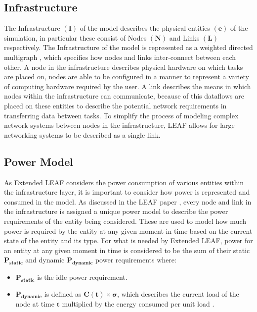 \documentclass{l4proj}
\begin{document}
\subsection{Infrastructure}\label{subsec:infrastructure}
The Infrastructure $\mathbf{(I)}$ of the model describes the physical entities $\mathbf{(e)}$ of the simulation, in particular these consist of Nodes $\mathbf{(N)}$ and Links $\mathbf{(L)}$ respectively.
The Infrastructure of the model is represented as a weighted directed multigraph \citep{leaf2021}, which specifies how nodes and links inter-connect between each other.
A node in the infrastructure describes physical hardware on which tasks are placed on, nodes are able to be configured in a manner to represent a variety of computing hardware required by the user.
A link describes the means in which nodes within the infrastructure can communicate, because of this dataflows are placed on these entities to describe the potential network requirements in transferring data between tasks.
To simplify the process of modeling complex network systems between nodes in the infrastructure, LEAF allows for large networking systems to be described as a single link.

\subsection{Power Model}\label{subsec:power-model}
As Extended LEAF considers the power consumption of various entities within the infrastructure layer, it is important to consider how power is represented and consumed in the model.
As discussed in the LEAF paper \cite{leaf2021}, every node and link in the infrastructure is assigned a unique power model to describe the power requirements of the entity being considered.
These are used to model how much power is required by the entity at any given moment in time based on the current state of the entity and its type.
For what is needed by Extended LEAF, power for an entity at any given moment in time is considered to be the sum of their static $\mathbf{P_{static}}$ and dynamic $\mathbf{P_{dynamic}}$ power requirements where:
\begin{itemize}
    \item $\mathbf{P_{static}}$ is the idle power requirement.\\
    \item $\mathbf{P_{dynamic}}$ is defined as $\mathbf{C(t) \times \sigma}$, which describes the current load of the node at time $\mathbf{t}$ multiplied by the energy consumed per unit load \citep{leaf2021}.
\end{itemize}
\end{document}
